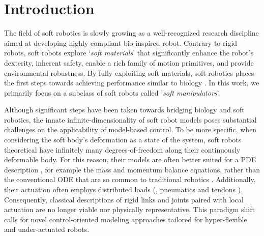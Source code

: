 \section{Introduction} \label{sec:chap3_introduction}
The field of soft robotics is slowly growing as a well-recognized research discipline aimed at developing highly compliant bio-inspired robot. Contrary to rigid robots, soft robots explore `\textit{soft materials}' that significantly enhance the robot's dexterity, inherent safety, enable a rich family of motion primitives, and provide environmental robustness. By fully exploiting soft materials, soft robotics places the first steps towards achieving performance similar to biology \cite{Choi2011,Falkenhahn2015,Marchese2014}. In this work, we primarily focus on a subclass of soft robots called '\textit{soft manipulators}'.

Although significant steps have been taken towards bridging biology and soft robotics, the innate infinite-dimensionality of soft robot models poses substantial challenges on the applicability of model-based control. To be more specific, when considering the soft body's deformation as a state of the system, soft robots theoretical have infinitely many degrees-of-freedom along their continuously deformable body. For this reason, their models are often better suited for a PDE description \cite{Duriez2013,Largilliere2015,Wu2021Feb}, for example the mass and momentum balance equations, rather than the conventional ODE that are so common to traditional robotics \cite{Spong2006,Murray1994}. Additionally, their actuation often employs distributed loads (\eg, pneumatics \cite{Falkenhahn2015,Marchese2014} and tendons \cite{Till2019,Wu2021Feb}). Consequently, classical descriptions of rigid links and joints paired with local actuation are no longer viable nor physically representative. This paradigm shift calls for novel control-oriented modeling approaches tailored for hyper-flexible and under-actuated robots.

